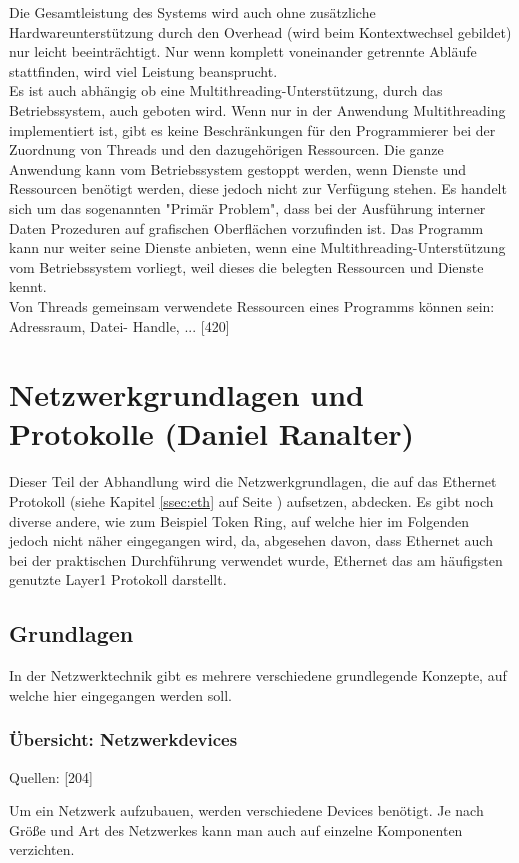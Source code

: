 \documentclass[12pt,a4paper]{report}
\begin{document}
\begin{onehalfspace}
Die Gesamtleistung des Systems wird auch ohne zusätzliche Hardwareunterstützung durch den Overhead (wird beim Kontextwechsel gebildet) nur leicht beeinträchtigt. Nur wenn komplett voneinander getrennte Abläufe stattfinden, wird viel Leistung beansprucht.\\

Es ist auch abhängig ob eine Multithreading-Unterstützung, durch das Betriebssystem, auch geboten wird. Wenn nur in der Anwendung Multithreading implementiert ist, gibt es keine Beschränkungen für den Programmierer bei der Zuordnung von Threads und den dazugehörigen Ressourcen. Die ganze Anwendung kann vom Betriebssystem gestoppt werden, wenn Dienste und Ressourcen benötigt werden, diese jedoch nicht zur Verfügung stehen. Es handelt sich um das sogenannten "{}Primär Problem"{}, dass bei der Ausführung interner Daten Prozeduren auf grafischen Oberflächen vorzufinden ist. Das Programm kann nur weiter seine Dienste anbieten, wenn eine Multithreading-Unterstützung vom Betriebssystem vorliegt, weil dieses die belegten Ressourcen und Dienste kennt.\\

Von Threads gemeinsam verwendete Ressourcen eines Programms können sein: Adressraum, Datei- Handle, ... [420]
\newpage
{}
\chapter{Netzwerkgrundlagen und Protokolle (Daniel Ranalter)}
Dieser Teil der Abhandlung wird die Netzwerkgrundlagen, die auf das Ethernet Protokoll (siehe Kapitel \ref{ssec:eth} auf Seite \pageref{ssec:eth}) aufsetzen, abdecken. Es gibt noch diverse andere, wie zum Beispiel Token Ring, auf welche hier im Folgenden jedoch nicht näher eingegangen wird, da, abgesehen davon, dass Ethernet auch bei der praktischen Durchführung verwendet wurde, Ethernet das am häufigsten genutzte Layer1 Protokoll darstellt. 

\section{Grundlagen}
In der Netzwerktechnik gibt es mehrere verschiedene grundlegende Konzepte, auf welche hier eingegangen werden soll.

\subsection{Übersicht: Netzwerkdevices}
\begin{flushright}
\begin{tiny}
Quellen: [204]
\end{tiny}
\end{flushright}
Um ein Netzwerk aufzubauen, werden verschiedene Devices benötigt. Je nach Größe und Art des Netzwerkes kann man auch auf einzelne Komponenten verzichten. 


\end{onehalfspace}
\end{document}
